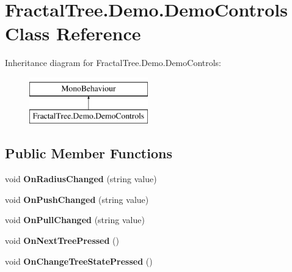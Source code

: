 \hypertarget{class_fractal_tree_1_1_demo_1_1_demo_controls}{}\section{Fractal\+Tree.\+Demo.\+Demo\+Controls Class Reference}
\label{class_fractal_tree_1_1_demo_1_1_demo_controls}
Inheritance diagram for Fractal\+Tree.\+Demo.\+Demo\+Controls\+:\begin{figure}[H]
\begin{center}
\leavevmode
\includegraphics[height=2.000000cm]{class_fractal_tree_1_1_demo_1_1_demo_controls}
\end{center}
\end{figure}
\subsection*{Public Member Functions}
\begin{DoxyCompactItemize}
\item 
\mbox{\label{class_fractal_tree_1_1_demo_1_1_demo_controls_a31ca5dcb7e12cf797ec714b78cedd5ef}} 
void {\bfseries On\+Radius\+Changed} (string value)
\item 
\mbox{\label{class_fractal_tree_1_1_demo_1_1_demo_controls_a2b7d31163419af37fb963c3391e96311}} 
void {\bfseries On\+Push\+Changed} (string value)
\item 
\mbox{\label{class_fractal_tree_1_1_demo_1_1_demo_controls_ab58233bc200b04f1c3862fae7bd6181f}} 
void {\bfseries On\+Pull\+Changed} (string value)
\item 
\mbox{\label{class_fractal_tree_1_1_demo_1_1_demo_controls_a626d1d5b1c433eccc4fcddaae5b693ae}} 
void {\bfseries On\+Next\+Tree\+Pressed} ()
\item 
\mbox{\label{class_fractal_tree_1_1_demo_1_1_demo_controls_a109d0a017190c30774b0d920edf85d0d}} 
void {\bfseries On\+Change\+Tree\+State\+Pressed} ()
\end{DoxyCompactItemize}

